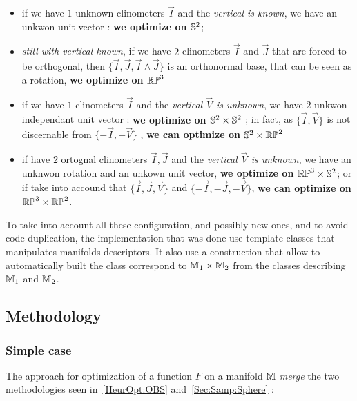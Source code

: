 \begin{itemize}
   \item if we have $1$ unknown clinometers $\vec I$ and the \emph{vertical is known}, we have an unkwon unit vector
          :   {\bf we optimize on $\mathbb{S}^2$};

   \item \emph{still with vertical known}, if we have $2$  clinometers $\vec I$ and $\vec J$ that 
         are forced to be orthogonal, then $\{\vec I,\vec J, \vec I \wedge \vec J\}$  is an orthonormal base, 
          that can be seen as a  rotation, {\bf we optimize on $\mathbb{RP}^3$}

   \item if we have $1$ clinometers  $\vec I$ and the \emph{vertical $\vec V$ is unknown}, 
         we have $2$ unkwon independant unit vector : {\bf we optimize on $\mathbb{S}^2 \times \mathbb{S}^2$} ; in 
         fact, as $\{\vec I,\vec V\}$ is not discernable from $\{-\vec I,-\vec V\}$ , 
          {\bf we can optimize on $\mathbb{S}^2 \times \mathbb{RP}^2$}
          
   \item if have $2$ ortognal clinometers  $\vec I,\vec J$ and the \emph{vertical $\vec V$ is unknown}, 
         we have an unknwon rotation and an unkown unit vector,  {\bf we optimize on $\mathbb{RP}^3 \times \mathbb{S}^2$};
         or if take into accound that  $\{\vec I,\vec J, \vec V\}$ and   $\{-\vec I,-\vec J, -\vec V\}$,
         {\bf we can optimize on $\mathbb{RP}^3 \times \mathbb{RP}^2$}.
\end{itemize}


To take into account all these configuration, and possibly new ones, and 
to avoid code duplication, the implementation that was done use template classes
that manipulates  manifolds descriptors. It also use a construction that allow to automatically
built the class correspond to $\mathbb{M}_1 \times \mathbb{M}_2$ from the classes describing
$\mathbb{M}_1$ and $\mathbb{M}_2$.


\subsection{Methodology}

\subsubsection{Simple case}
The approach for optimization of a function $F$ on a manifold $\mathbb{M}$  \emph{merge} the 
two methodologies seen in~\ref{HeurOpt:OBS} and~\ref{Sec:Samp:Sphere} :

